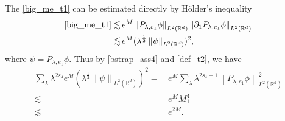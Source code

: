 \documentclass[10pt,twoside,a4paper]{article}
\numberwithin{equation}{section}\allowdisplaybreaks
\begin{document}
The  \eqref{big_me_t1} can be estimated directly by H\"older's inequality
\begin{align*}
	\eqref{big_me_t1}
	\lesssim &  \,e^M   \left\| P_{\lambda, e_1 } \phi   \right\|_{L^{2}(\mathbb{R}^d)} \left\|\partial_1  P_{\lambda, e_1 } \phi   \right\|_{L^{2}(\mathbb{R}^d)}\\
	\lesssim &\, e^M   (\lambda^{\frac 12} \left\| \psi\right\|_{L^{2}(\mathbb{R}^d)})^2,
\end{align*}
where $ \psi = P_{\lambda, e_1} \phi 
$. Thus by \eqref{bstrap_ass4} and \eqref{def_t2}, we have 
\begin{align*}
	\sum_{\lambda} \lambda^{2s_4} e^M   (\lambda^{\frac 12} \left\| \psi\right\|_{L^{2}(\mathbb{R}^d)})^2=  &	\, e^M    \sum_{\lambda} \lambda^{2s_4+1}   \left\|  P_{\lambda,e_1   }\phi \right\|_{L^{2}(\mathbb{R}^d)}^2\\
	\lesssim &\, e^{M } M_1^4 \\
	\lesssim & \,e^{2M}.
\end{align*}
\end{document}
